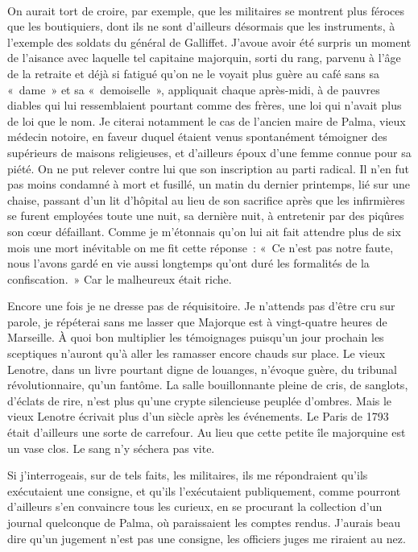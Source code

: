 \documentclass[french,twoside]{book} %
\newcommand{\astertri}{\medskip\par\centerline{\color{rubric}\large\selectfont{\syms ✻\,✻\,✻}}\medskip\par}%
\begin{document}
\astertri

\noindent  \par
On aurait tort de croire, par exemple, que les militaires se montrent plus féroces que les boutiquiers, dont ils ne sont d’ailleurs désormais que les instruments, à l’exemple des soldats du général de Galliffet. J’avoue avoir été surpris un moment de l’aisance avec laquelle tel capitaine majorquin, sorti du rang, parvenu à l’âge de la retraite et déjà si fatigué qu’on ne le voyait plus guère au café sans sa « dame » et sa « demoiselle », appliquait chaque après-midi, à de pauvres diables qui lui ressemblaient pourtant comme des frères, une loi qui n’avait plus de loi que le nom. Je citerai notamment le cas de l’ancien maire de Palma, vieux médecin notoire, en faveur duquel étaient venus spontanément témoigner des supérieurs de maisons religieuses, et d’ailleurs époux d’une femme connue pour sa piété. On ne put relever contre lui que son inscription au parti radical. Il n’en fut pas moins condamné à mort et fusillé, un matin du dernier printemps, lié sur une chaise, passant d’un lit d’hôpital au lieu de son sacrifice après que les infirmières se furent employées toute une nuit, sa dernière nuit, à entretenir par des piqûres son cœur défaillant. Comme je m’étonnais qu’on lui ait fait attendre plus de six mois une mort inévitable on me fit cette réponse : « Ce n’est pas notre faute, nous l’avons gardé en vie aussi longtemps qu’ont duré les formalités de la confiscation. » Car le malheureux était riche.\par
Encore une fois je ne dresse pas de réquisitoire. Je n’attends pas d’être cru sur parole, je répéterai sans me lasser que Majorque est à vingt-quatre heures de Marseille. À quoi bon multiplier les témoignages puisqu’un jour prochain les sceptiques n’auront qu’à aller les ramasser encore chauds sur place. Le vieux Lenotre, dans un livre pourtant digne de louanges, n’évoque guère, du tribunal révolutionnaire, qu’un fantôme. La salle bouillonnante pleine de cris, de sanglots, d’éclats de rire, n’est plus qu’une crypte silencieuse peuplée d’ombres. Mais le vieux Lenotre écrivait plus d’un siècle après les événements. Le Paris de 1793 était d’ailleurs une sorte de carrefour. Au lieu que cette petite île majorquine est un vase clos. Le sang n’y séchera pas vite.\par
Si j’interrogeais, sur de tels faits, les militaires, ils me répondraient qu’ils exécutaient une consigne, et qu’ils l’exécutaient publiquement, comme pourront d’ailleurs s’en convaincre tous les curieux, en se procurant la collection d’un journal quelconque de Palma, où paraissaient les comptes rendus. J’aurais beau dire qu’un jugement n’est pas une consigne, les officiers juges me riraient au nez.\par
\end{document}
